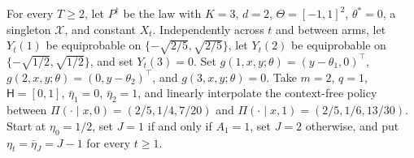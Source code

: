 For every \(T\ge2\), let \(P^{\dagger}\) be the law with \(K=3\), \(d=2\), \(\Theta=[-1,1]^2\), \(\theta^*=0\), a singleton \(\mathcal X\), and constant \(X_t\). Independently across \(t\) and between arms, let \(Y_t(1)\) be equiprobable on \(\{-\sqrt{2/5},\sqrt{2/5}\}\), let \(Y_t(2)\) be equiprobable on \(\{-\sqrt{1/2},\sqrt{1/2}\}\), and set \(Y_t(3)=0\). Set \(g(1,x,y;\theta)=(y-\theta_1,0)^\top\), \(g(2,x,y;\theta)=(0,y-\theta_2)^\top\), and \(g(3,x,y;\theta)=0\). Take \(m=2\), \(q=1\), \(\mathsf H=[0,1]\), \(\bar\eta_1=0\), \(\bar\eta_2=1\), and linearly interpolate the context-free policy between \(\Pi(\cdot\mid x,0)=(2/5,1/4,7/20)\) and \(\Pi(\cdot\mid x,1)=(2/5,1/6,13/30)\). Start at \(\eta_0=1/2\), set \(J=1\) if and only if \(A_1=1\), set \(J=2\) otherwise, and put \(\eta_t=\bar\eta_J=J-1\) for every \(t\ge1\).